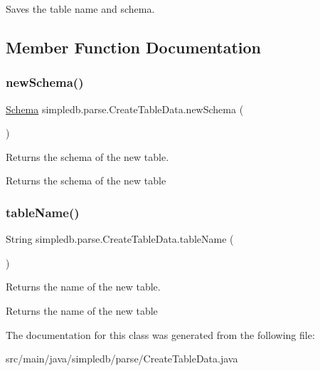 Saves the table name and schema. 

\subsection{Member Function Documentation}
\mbox{\label{classsimpledb_1_1parse_1_1CreateTableData_a857ab82373dbaca585855cbe46819716}} 
\subsubsection{\texorpdfstring{new\+Schema()}{newSchema()}}
{\footnotesize\ttfamily \hyperlink{classsimpledb_1_1record_1_1Schema}{Schema} simpledb.\+parse.\+Create\+Table\+Data.\+new\+Schema (\begin{DoxyParamCaption}{ }\end{DoxyParamCaption})\hspace{0.3cm}{\ttfamily [inline]}}

Returns the schema of the new table. \begin{DoxyReturn}{Returns}
the schema of the new table 
\end{DoxyReturn}
\mbox{\label{classsimpledb_1_1parse_1_1CreateTableData_a9fa3eaadef74386e30af0aaa8b52c272}} 
\subsubsection{\texorpdfstring{table\+Name()}{tableName()}}
{\footnotesize\ttfamily String simpledb.\+parse.\+Create\+Table\+Data.\+table\+Name (\begin{DoxyParamCaption}{ }\end{DoxyParamCaption})\hspace{0.3cm}{\ttfamily [inline]}}

Returns the name of the new table. \begin{DoxyReturn}{Returns}
the name of the new table 
\end{DoxyReturn}


The documentation for this class was generated from the following file\+:\begin{DoxyCompactItemize}
\item 
src/main/java/simpledb/parse/Create\+Table\+Data.\+java\end{DoxyCompactItemize}

